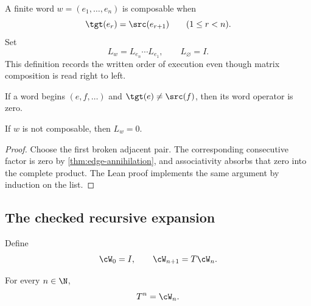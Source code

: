 \begin{definition}
\label{def:word-op}
A finite word $w=(e_1,\ldots,e_n)$ is composable when
\[
  \tgt(e_r)=\src(e_{r+1})
  \qquad (1\le r<n).
\]
Set
\[
  L_w=L_{e_n}\cdots L_{e_1},
  \qquad L_{\varnothing}=I.
\]
This definition records the written order of execution even though matrix
composition is read right to left.
\end{definition}

\begin{theorem}
\label{thm:first-break}
If a word begins $(e,f,\ldots)$ and $\tgt(e)\ne\src(f)$, then its word
operator is zero.
\end{theorem}

\begin{theorem}
\label{thm:nonwalk-vanish}
If $w$ is not composable, then $L_w=0$.
\end{theorem}

\begin{proof}
Choose the first broken adjacent pair.  The corresponding consecutive factor
is zero by \cref{thm:edge-annihilation}, and associativity absorbs that zero
into the complete product.  The Lean proof implements the same argument by
induction on the list.
\end{proof}

\subsection{The checked recursive expansion}

\begin{definition}
\label{def:recursive-word-expansion}
Define
\[
  \cW_0=I,
  \qquad
  \cW_{n+1}=T\cW_n.
\]
\end{definition}

\begin{theorem}
\label{thm:power-recursive-expansion}
For every $n\in\N$,
\[
  T^n=\cW_n.
\]
\end{theorem}

